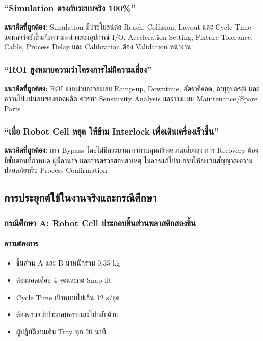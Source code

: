 \subsubsection{“Simulation ตรงกับระบบจริง 100\%”}

\textbf{แนวคิดที่ถูกต้อง:} Simulation มีประโยชน์ต่อ Reach, Collision, Layout และ Cycle Time แต่ผลจริงยังขึ้นกับความหน่วงของอุปกรณ์ I/O, Acceleration Setting, Fixture Tolerance, Cable, Process Delay และ Calibration ต้อง Validation หน้างาน

\subsubsection{“ROI สูงหมายความว่าโครงการไม่มีความเสี่ยง”}

\textbf{แนวคิดที่ถูกต้อง:} ROI แบบง่ายอาจละเลย Ramp-up, Downtime, อัตราคิดลด, อายุอุปกรณ์ และความไม่แน่นอนของยอดผลิต ควรทำ Sensitivity Analysis และวางแผน Maintenance/Spare Parts

\subsubsection{“เมื่อ Robot Cell หยุด ให้ข้าม Interlock เพื่อเดินเครื่องเร็วขึ้น”}

\textbf{แนวคิดที่ถูกต้อง:} การ Bypass โดยไม่มีกระบวนการควบคุมสร้างความเสี่ยงสูง การ Recovery ต้องมีขั้นตอนที่กำหนด ผู้มีอำนาจ และการตรวจสอบสาเหตุ ไม่ควรแก้โปรแกรมให้ละเว้นสัญญาณความปลอดภัยหรือ Process Confirmation



\subsection{การประยุกต์ใช้ในงานจริงและกรณีศึกษา}

\subsubsection{กรณีศึกษา A: Robot Cell ประกอบชิ้นส่วนพลาสติกสองชิ้น}

\paragraph{ความต้องการ}

\begin{itemize}
    \item ชิ้นส่วน A และ B น้ำหนักรวม 0.35 kg
    \item ต้องสอดเดือย 4 จุดและกด Snap-fit
    \item Cycle Time เป้าหมายไม่เกิน 12 s/ชุด
    \item ต้องตรวจว่าประกอบครบและไม่กลับด้าน
    \item ผู้ปฏิบัติงานเติม Tray ทุก 20 นาที
\end{itemize}

